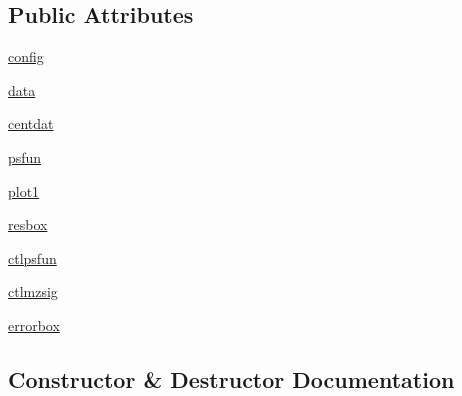 \subsection*{Public Attributes}
\begin{DoxyCompactItemize}
\item 
\hyperlink{class_uni_dec_1_1unidec__modules_1_1peakwidthtools_1_1_peak_tools1d_a6ff6c8a201fb7f597e7e4a0319e26623}{config}
\item 
\hyperlink{class_uni_dec_1_1unidec__modules_1_1peakwidthtools_1_1_peak_tools1d_a7209e1be38d1e677a5aa9c5cf6f0fe3e}{data}
\item 
\hyperlink{class_uni_dec_1_1unidec__modules_1_1peakwidthtools_1_1_peak_tools1d_ac01214c4ecd880642cddea115722f077}{centdat}
\item 
\hyperlink{class_uni_dec_1_1unidec__modules_1_1peakwidthtools_1_1_peak_tools1d_a38863ed894c56c9a7005bceb6556983d}{psfun}
\item 
\hyperlink{class_uni_dec_1_1unidec__modules_1_1peakwidthtools_1_1_peak_tools1d_a936aa95ef2bb21300020dc0df6462030}{plot1}
\item 
\hyperlink{class_uni_dec_1_1unidec__modules_1_1peakwidthtools_1_1_peak_tools1d_a3cf33230e20912f5562357da2ec79d1d}{resbox}
\item 
\hyperlink{class_uni_dec_1_1unidec__modules_1_1peakwidthtools_1_1_peak_tools1d_a4b4625e6ff63245434c7c5bbae8655d1}{ctlpsfun}
\item 
\hyperlink{class_uni_dec_1_1unidec__modules_1_1peakwidthtools_1_1_peak_tools1d_a32c57821d0d0908e9085a3230d3ced88}{ctlmzsig}
\item 
\hyperlink{class_uni_dec_1_1unidec__modules_1_1peakwidthtools_1_1_peak_tools1d_a0fdc3d645fdd074722d3fb43a0de2a54}{errorbox}
\end{DoxyCompactItemize}


\subsection{Constructor \& Destructor Documentation}
\hypertarget{class_uni_dec_1_1unidec__modules_1_1peakwidthtools_1_1_peak_tools1d_a77883b9bcc2c0e644390cabf11f2190a}{}

